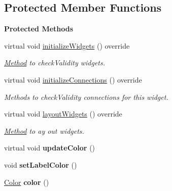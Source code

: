 \subsection*{Protected Member Functions}
\begin{Indent}\textbf{ Protected Methods}\par
\begin{DoxyCompactItemize}
\item 
\mbox{\label{classrev_1_1_view_1_1_color_widget_a3559046281852f630442c754004ab8c8}} 
virtual void \mbox{\hyperlink{classrev_1_1_view_1_1_color_widget_a3559046281852f630442c754004ab8c8}{initialize\+Widgets}} () override
\begin{DoxyCompactList}\small\item\em \mbox{\hyperlink{struct_method}{Method}} to check\+Validity widgets. \end{DoxyCompactList}\item 
\mbox{\label{classrev_1_1_view_1_1_color_widget_a980cc3cd608700d249023b1490e797eb}} 
virtual void \mbox{\hyperlink{classrev_1_1_view_1_1_color_widget_a980cc3cd608700d249023b1490e797eb}{initialize\+Connections}} () override
\begin{DoxyCompactList}\small\item\em Methods to check\+Validity connections for this widget. \end{DoxyCompactList}\item 
\mbox{\label{classrev_1_1_view_1_1_color_widget_a40b0895a2d8e087d61f83a73b73cb6fc}} 
virtual void \mbox{\hyperlink{classrev_1_1_view_1_1_color_widget_a40b0895a2d8e087d61f83a73b73cb6fc}{layout\+Widgets}} () override
\begin{DoxyCompactList}\small\item\em \mbox{\hyperlink{struct_method}{Method}} to ay out widgets. \end{DoxyCompactList}\item 
\mbox{\label{classrev_1_1_view_1_1_color_widget_a4e1df26e09613d2cfea83710a9300627}} 
virtual void {\bfseries update\+Color} ()
\item 
\mbox{\label{classrev_1_1_view_1_1_color_widget_acacf0facc6b35899516dc6630f1e5c9f}} 
void {\bfseries set\+Label\+Color} ()
\item 
\mbox{\label{classrev_1_1_view_1_1_color_widget_abd70080adfdc45bc3ee0758fad6a5bec}} 
\mbox{\hyperlink{classrev_1_1_color}{Color}} {\bfseries color} ()
\end{DoxyCompactItemize}
\end{Indent}

